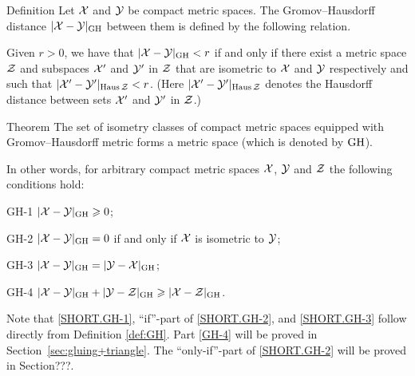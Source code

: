 \begin{thm}{Definition}\label{def:GH}
Let $\mathcal{X}$ and $\mathcal{Y}$ be compact metric spaces. 
The Gromov--Hausdorff distance $|\mathcal{X}-\mathcal{Y}|_{\operatorname{\rm GH}\nolimits}$
between them is defined by the following
relation.
 
Given  $r > 0$, we have that $|\mathcal{X}-\mathcal{Y}|_{\operatorname{\rm GH}\nolimits} < r$ if and only if there exist a metric
space $\mathcal{Z}$ and subspaces $\mathcal{X}'$ and $\mathcal{Y}'$ in $\mathcal{Z}$ that are isometric to $\mathcal{X}$ and $\mathcal{Y}$
respectively and such that $|\mathcal{X}'-\mathcal{Y}'|_{\operatorname{\rm Haus}\nolimits\mathcal{Z}} < r$. 
(Here $|\mathcal{X}'-\mathcal{Y}'|_{\operatorname{\rm Haus}\nolimits\mathcal{Z}}$ denotes the Hausdorff distance between sets $\mathcal{X}'$ and $\mathcal{Y}'$ in $\mathcal{Z}$.)
\end{thm}

\begin{thm}{Theorem}\label{thm:GH-is-a-metric}
The set of isometry classes of compact metric spaces equipped with Gromov--Hausdorff metric forms a metric space (which is denoted by $\operatorname{\rm GH}\nolimits$).

In other words, for arbitrary  compact metric spaces $\mathcal{X}$, $\mathcal{Y}$ and $\mathcal{Z}$ the following conditions hold:

\begin{subthm}{GH-1} $|\mathcal{X}-\mathcal{Y}|_{\operatorname{\rm GH}\nolimits}\geqslant 0$;
\end{subthm}

\begin{subthm}{GH-2} $|\mathcal{X}-\mathcal{Y}|_{\operatorname{\rm GH}\nolimits}=0$ if and only if $\mathcal{X}$ is isometric to $\mathcal{Y}$;
\end{subthm}

\begin{subthm}{GH-3} $|\mathcal{X}-\mathcal{Y}|_{\operatorname{\rm GH}\nolimits}=|\mathcal{Y}-\mathcal{X}|_{\operatorname{\rm GH}\nolimits}$;
\end{subthm}

\begin{subthm}{GH-4} $|\mathcal{X}-\mathcal{Y}|_{\operatorname{\rm GH}\nolimits}+|\mathcal{Y}-\mathcal{Z}|_{\operatorname{\rm GH}\nolimits}\geqslant |\mathcal{X}-\mathcal{Z}|_{\operatorname{\rm GH}\nolimits}$.
\end{subthm}
\end{thm}


Note that \ref{SHORT.GH-1}, ``if''-part of \ref{SHORT.GH-2}, and \ref{SHORT.GH-3} follow directly from Definition \ref{def:GH}.
Part \ref{GH-4} will be proved in Section~\ref{sec:gluing+triangle}.
The ``only-if''-part of \ref{SHORT.GH-2} will be proved in Section???.

